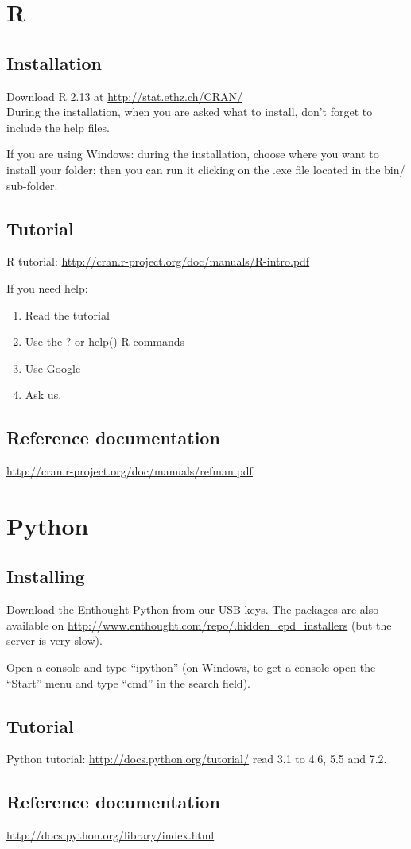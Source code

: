 \documentclass[a4paper,11pt]{article}
\begin{document}
\clearpage
\section{R}
\subsection{Installation} 
Download R 2.13 at \url{http://stat.ethz.ch/CRAN/}\\
During the installation, when you are asked what to install, don't forget to include the help files.

If you are using Windows: during the installation, choose where you want to install your folder; then you can run it clicking on the .exe file located in the bin/ sub-folder. 

\subsection{Tutorial}
R tutorial: \url{http://cran.r-project.org/doc/manuals/R-intro.pdf}
    
If you need help:
\begin{enumerate}
\item Read the tutorial
\item Use the ? or help() R commands
\item Use Google
\item Ask us.
\end{enumerate}

\subsection{Reference documentation}
\url{http://cran.r-project.org/doc/manuals/refman.pdf}

\section{Python}

\subsection{Installing}
Download the Enthought Python from our USB keys. The packages are also available on \url{http://www.enthought.com/repo/.hidden_epd_installers} (but the server is very slow).

Open a console and type ``ipython''
(on Windows, to get a console open the ``Start'' menu and type ``cmd'' in the search field).

\subsection{Tutorial}
Python tutorial: \url{http://docs.python.org/tutorial/} read 3.1 to 4.6, 5.5 and 7.2.

\subsection{Reference documentation}
\url{http://docs.python.org/library/index.html}
\end{document}
